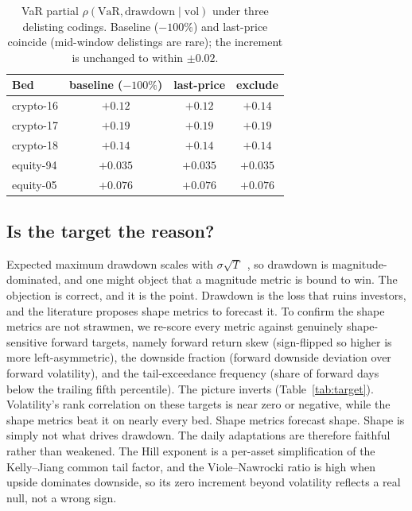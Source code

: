 \documentclass[sigconf,anonymous,nonacm]{acmart}
\begin{document}
\begin{table}[t]
\centering
\small
\caption{VaR partial $\rho(\text{VaR},\text{drawdown}\mid\text{vol})$ under three
delisting codings. Baseline ($-100\%$) and last-price coincide (mid-window delistings are
rare); the increment is unchanged to within $\pm0.02$.}
\label{tab:delisting}
\begin{tabular}{lccc}
\toprule
Bed & baseline ($-100\%$) & last-price & exclude \\
\midrule
crypto-16 & $+0.12$  & $+0.12$  & $+0.14$  \\
crypto-17 & $+0.19$  & $+0.19$  & $+0.19$  \\
crypto-18 & $+0.14$  & $+0.14$  & $+0.14$  \\
equity-94 & $+0.035$ & $+0.035$ & $+0.035$ \\
equity-05 & $+0.076$ & $+0.076$ & $+0.076$ \\
\bottomrule
\end{tabular}
\end{table}

\subsection{Is the target the reason?}
Expected maximum drawdown scales with $\sigma\sqrt{T}$~\cite{magdonismail2004}, so
drawdown is magnitude-dominated, and one might object that a magnitude metric is bound
to win. The objection is correct, and it is the point. Drawdown is the loss that ruins
investors, and the literature proposes shape metrics to forecast it. To confirm the
shape metrics are not strawmen, we re-score every metric against genuinely
shape-sensitive forward targets, namely forward return skew (sign-flipped so higher is
more left-asymmetric), the downside fraction (forward downside deviation over forward
volatility), and the tail-exceedance frequency (share of forward days below the trailing
fifth percentile). The picture inverts (Table~\ref{tab:target}). Volatility's rank
correlation on these targets is near zero or negative, while the shape metrics beat it on
nearly every bed. Shape metrics forecast shape. Shape is simply not what drives drawdown.
The daily adaptations are therefore faithful rather than weakened. The Hill exponent is a
per-asset simplification of the Kelly--Jiang common tail factor, and the Viole--Nawrocki
ratio is high when upside dominates downside, so its zero increment beyond volatility
reflects a real null, not a wrong sign.
\end{document}
